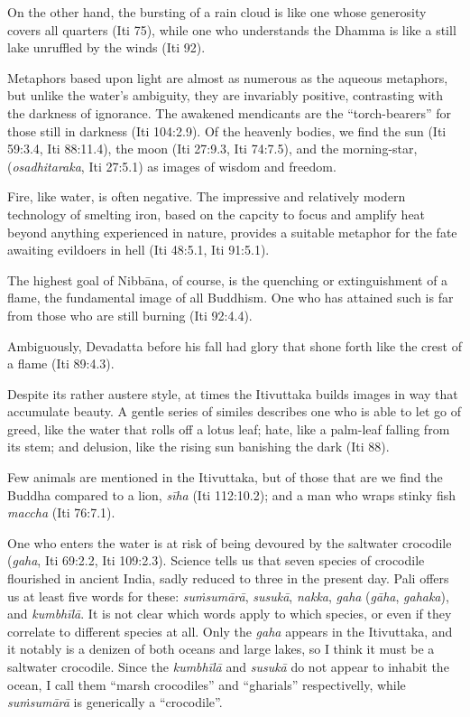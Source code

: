 \documentclass[12pt,openany]{book}%
\begin{document}
On the other hand, the bursting of a rain cloud is like one whose generosity covers all quarters (Iti 75), while one who understands the Dhamma is like a still lake unruffled by the winds (Iti 92).

Metaphors based upon light are almost as numerous as the aqueous metaphors, but unlike the water’s ambiguity, they are invariably positive, contrasting with the darkness of ignorance. The awakened mendicants are the “torch-bearers” for those still in darkness (Iti 104:2.9).  Of the heavenly bodies, we find the sun (Iti 59:3.4, Iti 88:11.4), the moon (Iti 27:9.3, Iti 74:7.5), and the morning-star, (\emph{osadhitaraka}, Iti 27:5.1) as images of wisdom and freedom.

Fire, like water, is often negative. The impressive and relatively modern technology of smelting iron, based on the capcity to focus and amplify heat beyond anything experienced in nature, provides a suitable metaphor for the fate awaiting evildoers in hell (Iti 48:5.1, Iti 91:5.1).

The highest goal of \textsanskrit{Nibbāna}, of course, is the quenching or extinguishment of a flame, the fundamental image of all Buddhism. One who has attained such is far from those who are still burning (Iti 92:4.4).

Ambiguously, Devadatta before his fall had glory that shone forth like the crest of a flame (Iti 89:4.3).

Despite its rather austere style, at times the Itivuttaka builds images in way that accumulate beauty. A gentle series of similes describes one who is able to let go of greed, like the water that rolls off a lotus leaf; hate, like a palm-leaf falling from its stem; and delusion, like the rising sun banishing the dark (Iti 88).

Few animals are mentioned in the Itivuttaka, but of those that are we find the Buddha compared to a lion, \emph{\textsanskrit{sīha}} (Iti 112:10.2); and a man who wraps stinky fish  \emph{maccha} (Iti 76:7.1).

One who enters the water is at risk of being devoured by the saltwater crocodile (\emph{gaha}, Iti 69:2.2, Iti 109:2.3). Science tells us that seven species of crocodile flourished in ancient India, sadly reduced to three in the present day. Pali offers us at least five words for these: \emph{\textsanskrit{suṁsumārā}}, \emph{\textsanskrit{susukā}}, \emph{nakka}, \emph{gaha} (\emph{\textsanskrit{gāha}},  \emph{gahaka}), and \emph{\textsanskrit{kumbhīlā}}. It is not clear which words apply to which species, or even if they correlate to different species at all. Only the \emph{gaha} appears in the Itivuttaka, and it notably is a denizen of both oceans and large lakes, so I think it must be a saltwater crocodile. Since the  \emph{\textsanskrit{kumbhīlā}} and \emph{\textsanskrit{susukā}} do not appear to inhabit the ocean, I call them “marsh crocodiles” and “gharials” respectivelly, while \emph{\textsanskrit{suṁsumārā}} is generically a “crocodile”.
\end{document}
